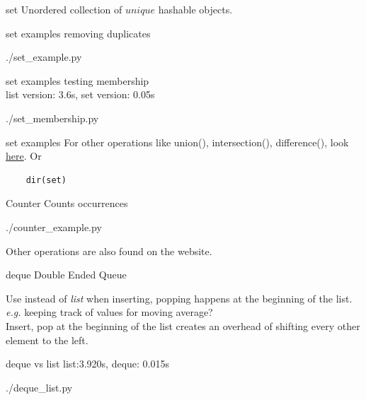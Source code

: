\documentclass{beamer}
\begin{document}
\begin{frame}{set}
  Unordered collection of $unique$ hashable objects.\\
\end{frame}

\begin{frame}{set examples}
  removing duplicates
  \begin{lstinputlisting}
    {./set_example.py}
  \end{lstinputlisting}
\end{frame}

\begin{frame}{set examples}
  testing membership\\
  list version: 3.6s, set version: 0.05s
  \begin{lstinputlisting}
    {./set_membership.py}
  \end{lstinputlisting}
\end{frame}

\begin{frame}[fragile]{set examples}
  For other operations like union(), intersection(), difference(), look
  \href{https://docs.python.org/2/library/stdtypes.html\#set}{here}.
  Or
  \begin{lstlisting}
    dir(set)
  \end{lstlisting}
\end{frame}

\begin{frame}{Counter}
  Counts occurrences
  \begin{lstinputlisting}
    {./counter_example.py}
  \end{lstinputlisting}
  Other operations are also found on the website.
\end{frame}

\begin{frame}{deque}
  Double Ended Queue

  Use instead of \textit{list} when inserting, popping happens at the beginning
  of the list. \textit{e.g.} keeping track of values for moving average?\\
  Insert, pop at the beginning of the list creates an overhead of
  shifting every other element to the left.\\
\end{frame}

\begin{frame}{deque vs list}
  list:3.920s, deque: 0.015s
  \begin{lstinputlisting}
    {./deque_list.py}
  \end{lstinputlisting}
\end{frame}
\end{document}
